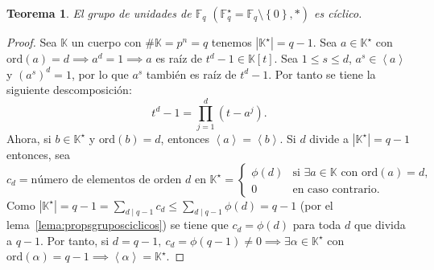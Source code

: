 \documentclass[10pt, spanish]{report}
\newtheorem{tma}{Teorema}[chapter]
\theoremstyle{definition}
\theoremstyle{custom}
\theoremstyle{remark}
\newcommand{\F}{\mathbb{F}}
\newcommand{\K}{\mathbb{K}}
\newcommand{\ord}[1]{\text{ord}(#1)}
\renewcommand{\leq}{\leqslant}
\begin{document}
\begin{tma}\label{tma:grupounidadesciclico}
    El grupo de unidades de $\F_q$ $\left( \F_q^\star=\F_q\setminus\left\{ 0
    \right\},*\right)$ es cíclico.
\end{tma}

\begin{proof}
    Sea $\K$ un cuerpo con $\#\K=p^n=q$ tenemos $\left|\K^\star\right|=q-1$. Sea
    $a\in\K^\star$ con $\ord{a}=d \implies a^d=1 \implies a$ es raíz de
    $t^d-1\in\K[t]$. Sea $1\leq s\leq d$, $a^s\in\left<a\right>$ y $(a^s)^d=1$,
    por lo que $a^s$ también es raíz de $t^d-1$. Por tanto se tiene la siguiente
    descomposición: \[t^d-1=\prod_{j=1}^{d}(t-a^j).\]
    Ahora, si $b\in\K^\star$ y $\ord{b}=d$, entonces $\left<a\right> = \left<b
    \right>$. Si $d$ divide a $\left| \K^\star \right| = q-1$ entonces, sea
    \[c_d=\text{número de elementos de orden }d\text{ en }\K^\star=
        \begin{cases}
            \phi(d)&\text{si }\exists a\in\K \text{ con }\ord{a}=d,\\
            0&\text{en caso contrario}.
        \end{cases}\]
        Como $\left|\K^\star\right|=q-1=\sum_{d\mid q-1} c_d\leq \sum_{d\mid
        q-1}\phi(d)=q-1$ (por el lema~\ref{lema:propsgruposciclicos}) se tiene
        que $c_d=\phi(d)$ para toda $d$ que divida a $q-1$. Por tanto, si
        $d=q-1,\ c_d=\phi(q-1)\neq0 \implies\exists\alpha\in\K^\star$ con
        $\ord{\alpha}=q-1\implies \left<\alpha\right>=\K^\star$.
\end{proof}
\end{document}
